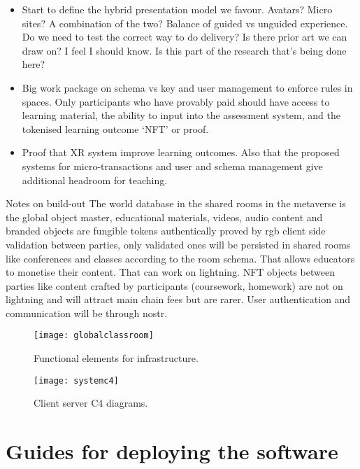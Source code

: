 \documentclass[
	12pt, %
	fleqn, %
	a4paper, %
	oneside, %
]{LegrandOrangeBook}
\begin{document}
\begin{itemize}
\item Start to define the hybrid presentation model we favour. Avatars? Micro sites? A combination of the two? Balance of guided vs unguided experience. Do we need to test the correct way to do delivery? Is there prior art we can draw on? I feel I should know. Is this part of the research that's being done here?
\item Big work package on schema vs key and user management to enforce rules in spaces. Only participants who have provably paid should have access to learning material, the ability to input into the assessment system, and the tokenised learning outcome `NFT' or proof.
\item Proof that XR system improve learning outcomes. Also that the proposed systems for micro-transactions and user and schema management give additional headroom for teaching.
\end{itemize}

Notes on build-out
The world database in the shared rooms in the metaverse is the global object master,  educational materials, videos,  audio content and branded objects are fungible tokens authentically proved by rgb client side validation between parties,  only validated ones will be persisted in shared rooms like conferences and classes according to the room schema. That allows educators to monetise their content.  That can work on lightning.  NFT objects between parties like content crafted by participants (coursework, homework) are not on lightning and will attract main chain fees but are rarer. User authentication and communication will be through nostr.

\begin{figure*}[ht]\centering %
	\texttt{[image: globalclassroom]}
	\caption{Functional elements for infrastructure.}
	\label{fig:globalclassroom}
\end{figure*}

\begin{figure*}[ht]\centering %
	\texttt{[image: systemc4]}
	\caption{Client server C4 diagrams.}
	\label{fig:globalclassroom}
\end{figure*}


\part{Guides for deploying the software}


\stopcontents[part] %
\end{document}
